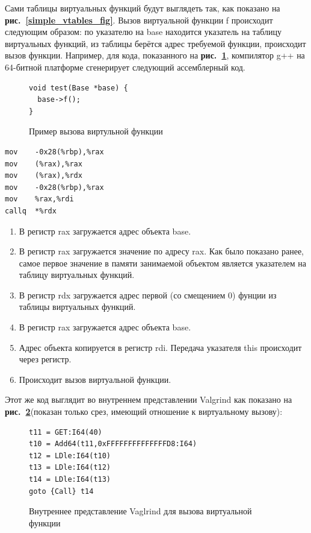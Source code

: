 \documentclass[a4paper,12pt,russian]{article}
\newcommand{\picref}[1]{\textbf{рис.~\ref{#1}}}
\newcommand{\code}[1]{\textsf{#1}}
\begin{document}
Сами таблицы виртуальных функций будут выглядеть так, как показано на \picref{simple_vtables_fig}.
Вызов виртуальной функции \code{f} происходит следующим образом: по указателю на \code{base} находится указатель на таблицу виртуальных функций, из таблицы берётся адрес требуемой функции, происходит вызов функции.
Например, для кода, показанного на \picref{virtual_call_lst}, компилятор g++ на 64-битной платформе сгенерирует следующий ассемблерный код.
\begin{figure}
\begin{lstlisting}
void test(Base *base) {
  base->f();
}
\end{lstlisting}
\caption{Пример вызова виртульной функции}
\label{virtual_call_lst}
\end{figure}

\begin{minipage}[b]{\linewidth}
\vspace{0.5cm}
\begin{minipage}[t]{0.40\linewidth}
\begin{lstlisting}[language={[x86masm]Assembler}]
mov    -0x28(%rbp),%rax
mov    (%rax),%rax
mov    (%rax),%rdx
mov    -0x28(%rbp),%rax
mov    %rax,%rdi
callq  *%rdx
\end{lstlisting}
\end{minipage}
\vline
\begin{minipage}[t]{0.45\linewidth}
\begin{enumerate}
\item В регистр \code{rax} загружается адрес объекта \code{base}.
\item В регистр \code{rax} загружается значение по адресу \code{rax}. Как было показано ранее, самое первое значение в памяти занимаемой объектом является указателем на таблицу виртуальных функций.
\item В регистр \code{rdx} загружается адрес первой (со смещением $0$) фунции из таблицы виртуальных функций.
\item В регистр \code{rax} загружается адрес объекта \code{base}.
\item Адрес объекта копируется в регистр \code{rdi}. Передача указателя \code{this} происходит через регистр.
\item Происходит вызов виртуальной функции.
\end{enumerate}
\end{minipage}
\vspace{0.5cm}
\end{minipage}

Этот же код выглядит во внутреннем представлении \code{Valgrind} как показано на \picref{vcall_valgrind_lst}(показан только срез, имеющий отношение к виртуальному вызову):
\begin{figure}
\begin{lstlisting}
t11 = GET:I64(40)
t10 = Add64(t11,0xFFFFFFFFFFFFFFD8:I64)
t12 = LDle:I64(t10)
t13 = LDle:I64(t12)
t14 = LDle:I64(t13)
goto {Call} t14
\end{lstlisting}
\caption{Внутреннее представление \code{Vaglrind} для вызова виртуальной функции}
\label{vcall_valgrind_lst}
\end{figure}
\end{document}
